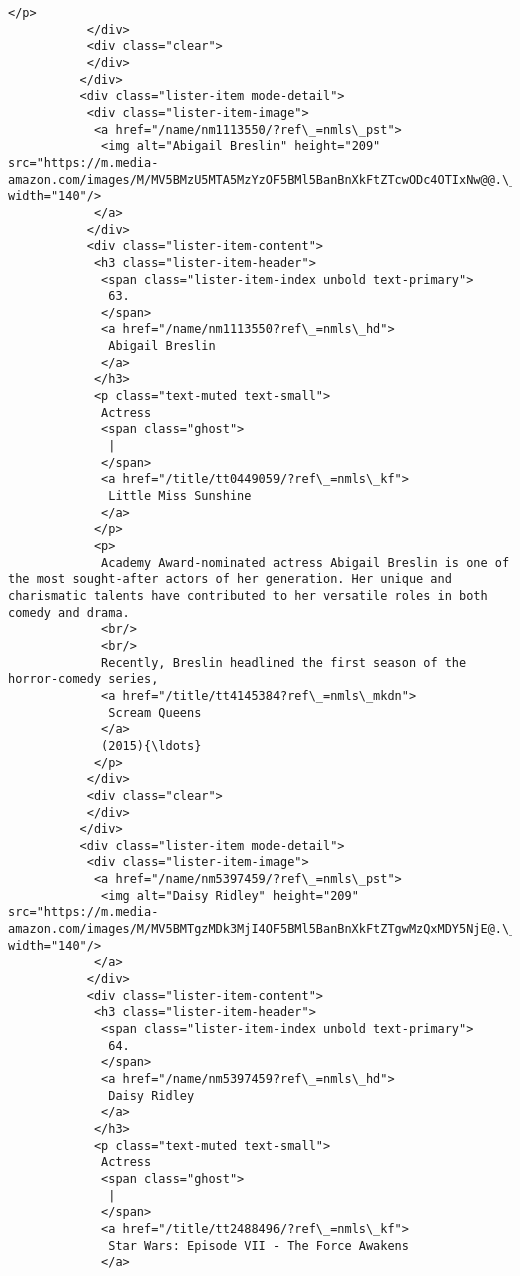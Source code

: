 \documentclass[11pt]{article}
\begin{document}
\begin{Verbatim}[commandchars=\\\{\}]
            </p>
           </div>
           <div class="clear">
           </div>
          </div>
          <div class="lister-item mode-detail">
           <div class="lister-item-image">
            <a href="/name/nm1113550/?ref\_=nmls\_pst">
             <img alt="Abigail Breslin" height="209" src="https://m.media-amazon.com/images/M/MV5BMzU5MTA5MzYzOF5BMl5BanBnXkFtZTcwODc4OTIxNw@@.\_V1\_UY209\_CR3,0,140,209\_AL\_.jpg" width="140"/>
            </a>
           </div>
           <div class="lister-item-content">
            <h3 class="lister-item-header">
             <span class="lister-item-index unbold text-primary">
              63.
             </span>
             <a href="/name/nm1113550?ref\_=nmls\_hd">
              Abigail Breslin
             </a>
            </h3>
            <p class="text-muted text-small">
             Actress
             <span class="ghost">
              |
             </span>
             <a href="/title/tt0449059/?ref\_=nmls\_kf">
              Little Miss Sunshine
             </a>
            </p>
            <p>
             Academy Award-nominated actress Abigail Breslin is one of the most sought-after actors of her generation. Her unique and charismatic talents have contributed to her versatile roles in both comedy and drama.
             <br/>
             <br/>
             Recently, Breslin headlined the first season of the horror-comedy series,
             <a href="/title/tt4145384?ref\_=nmls\_mkdn">
              Scream Queens
             </a>
             (2015){\ldots}
            </p>
           </div>
           <div class="clear">
           </div>
          </div>
          <div class="lister-item mode-detail">
           <div class="lister-item-image">
            <a href="/name/nm5397459/?ref\_=nmls\_pst">
             <img alt="Daisy Ridley" height="209" src="https://m.media-amazon.com/images/M/MV5BMTgzMDk3MjI4OF5BMl5BanBnXkFtZTgwMzQxMDY5NjE@.\_V1\_UY209\_CR13,0,140,209\_AL\_.jpg" width="140"/>
            </a>
           </div>
           <div class="lister-item-content">
            <h3 class="lister-item-header">
             <span class="lister-item-index unbold text-primary">
              64.
             </span>
             <a href="/name/nm5397459?ref\_=nmls\_hd">
              Daisy Ridley
             </a>
            </h3>
            <p class="text-muted text-small">
             Actress
             <span class="ghost">
              |
             </span>
             <a href="/title/tt2488496/?ref\_=nmls\_kf">
              Star Wars: Episode VII - The Force Awakens
             </a>

\end{Verbatim}
\end{document}
